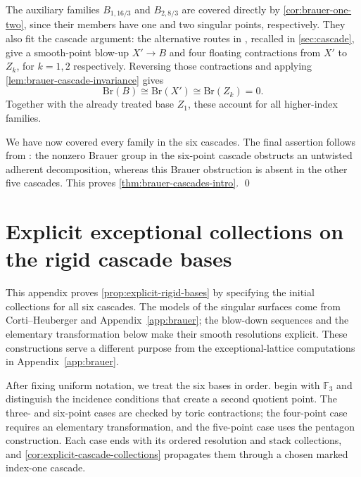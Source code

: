 \documentclass[11pt]{article}
\theoremstyle{plain}
\theoremstyle{definition}
\theoremstyle{remark}
\newcommand{\F}{\mathbb F}
\newcommand{\Br}{\mathrm{Br}}
\begin{document}
The auxiliary families \(B_{1,16/3}\) and \(B_{2,8/3}\) are covered
directly by \cref{cor:brauer-one-two}, since their members have one and
two singular points, respectively. They also fit the cascade argument:
the alternative routes in \cite[Remark~9]{Corti2016}, recalled in
\cref{sec:cascade}, give a smooth-point blow-up \(X'\to B\) and four
floating contractions from \(X'\) to \(Z_k\), for \(k=1,2\) respectively.
Reversing those contractions and applying
\cref{lem:brauer-cascade-invariance} gives
\[
\Br(B)\cong\Br(X')\cong\Br(Z_k)=0.
\]
Together with the already treated base \(Z_1\), these account for all
higher-index families.

We have now covered every family in the six cascades. The final assertion
follows from \cite[Corollary~4.8]{KKS2020}: the nonzero Brauer group in the
six-point cascade obstructs an untwisted adherent decomposition, whereas this
Brauer obstruction is absent in the other five cascades. This proves
\cref{thm:brauer-cascades-intro}. \qed


\section{Explicit exceptional collections on the rigid cascade bases}
\label{app:explicit-bases}

This appendix proves \cref{prop:explicit-rigid-bases} by specifying the
initial collections for all six cascades. The models of the singular
surfaces come from Corti--Heuberger and Appendix~\ref{app:brauer}; the
blow-down sequences and the elementary transformation below make their
smooth resolutions explicit. These constructions serve a different
purpose from the exceptional-lattice computations in Appendix~\ref{app:brauer}.

After fixing uniform notation, we treat the six bases in order.
 begin with \(\F_3\)
and distinguish the incidence conditions that create a second quotient
point. The three- and six-point cases are checked by toric contractions;
the four-point case requires an elementary transformation, and the
five-point case uses the pentagon construction. Each case ends with its
ordered resolution and stack collections, and
\cref{cor:explicit-cascade-collections} propagates them through a chosen
marked index-one cascade.
\end{document}
